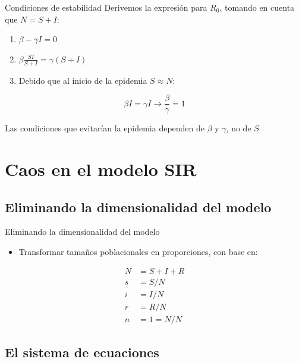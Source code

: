 \documentclass[
  11pt,
  ignorenonframetext,
]{beamer}
\providecommand{\tightlist}{%
  \setlength{\itemsep}{0pt}\setlength{\parskip}{0pt}}
\begin{document}
\begin{frame}{Condiciones de estabilidad}
Derivemos la expresión para \(R_0\), tomando en cuenta que \(N = S+I\):

\begin{enumerate}
\item
  \(\beta - \gamma I = 0\)
\item
  \(\beta \frac{SI}{S+I} = \gamma(S+I)\)
\item
  Debido que al inicio de la epidemia \(S \approx N\):
\end{enumerate}

\[\beta I = \gamma I \rightarrow \frac{\beta}{\gamma} = 1\]

Las condiciones que evitarían la epidemia dependen de \(\beta\) y
\(\gamma\), no de \(S\)
\end{frame}

\hypertarget{caos-en-el-modelo-sir}{%
\section{Caos en el modelo SIR}\label{caos-en-el-modelo-sir}}

\hypertarget{eliminando-la-dimensionalidad-del-modelo}{%
\subsection{Eliminando la dimensionalidad del
modelo}\label{eliminando-la-dimensionalidad-del-modelo}}

\begin{frame}{Eliminando la dimensionalidad del modelo}
\begin{itemize}
\tightlist
\item
  Transformar tamaños poblacionales en proporciones, con base en:
\end{itemize}

\begin{align}
N & = S+I+R \\
s & = S/N \\
i & = I/N \\
r & = R/N \\
n & = 1 = N/N
\end{align}
\end{frame}

\hypertarget{el-sistema-de-ecuaciones}{%
\subsection{El sistema de ecuaciones}\label{el-sistema-de-ecuaciones}}
\end{document}

